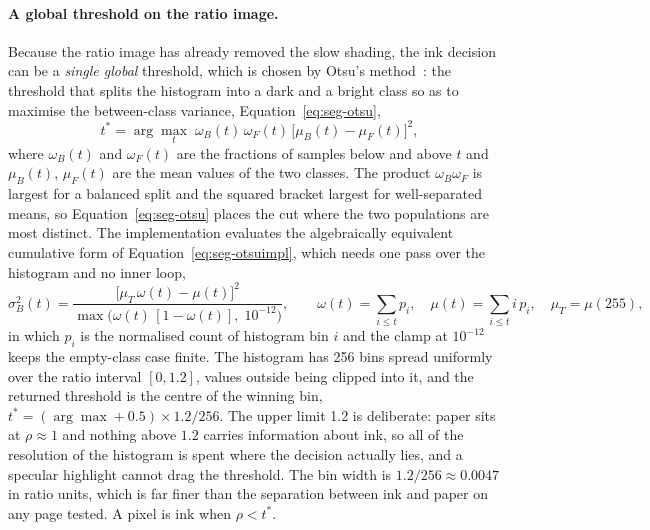 \paragraph{A global threshold on the ratio image.}
Because the ratio image has already removed the slow shading, the ink decision can be a \emph{single global} threshold, which is chosen by Otsu's method~\cite{otsu1979}: the threshold that splits the histogram into a dark and a bright class so as to maximise the between-class variance, Equation~\ref{eq:seg-otsu},
\begin{equation}
t^*=\arg\max_t\;\omega_B(t)\,\omega_F(t)\,\bigl[\mu_B(t)-\mu_F(t)\bigr]^2,
\label{eq:seg-otsu}
\end{equation}
where $\omega_B(t)$ and $\omega_F(t)$ are the fractions of samples below and above $t$ and $\mu_B(t)$, $\mu_F(t)$ are the mean values of the two classes.
The product $\omega_B\omega_F$ is largest for a balanced split and the squared bracket largest for well-separated means, so Equation~\ref{eq:seg-otsu} places the cut where the two populations are most distinct.
The implementation evaluates the algebraically equivalent cumulative form of Equation~\ref{eq:seg-otsuimpl}, which needs one pass over the histogram and no inner loop,
\begin{equation}
\sigma_B^2(t)=\frac{\bigl[\mu_T\,\omega(t)-\mu(t)\bigr]^2}{\max\bigl(\omega(t)\,[1-\omega(t)],\;10^{-12}\bigr)},\qquad
\omega(t)=\sum_{i\le t}p_i,\quad \mu(t)=\sum_{i\le t} i\,p_i,\quad \mu_T=\mu(255),
\label{eq:seg-otsuimpl}
\end{equation}
in which $p_i$ is the normalised count of histogram bin $i$ and the clamp at $10^{-12}$ keeps the empty-class case finite.
The histogram has 256 bins spread uniformly over the ratio interval $[0,1.2]$, values outside being clipped into it, and the returned threshold is the centre of the winning bin, $t^*=(\arg\max+0.5)\times1.2/256$.
The upper limit 1.2 is deliberate: paper sits at $\rho\approx1$ and nothing above $1.2$ carries information about ink, so all of the resolution of the histogram is spent where the decision actually lies, and a specular highlight cannot drag the threshold.
The bin width is $1.2/256\approx0.0047$ in ratio units, which is far finer than the separation between ink and paper on any page tested.
A pixel is ink when $\rho<t^*$.

